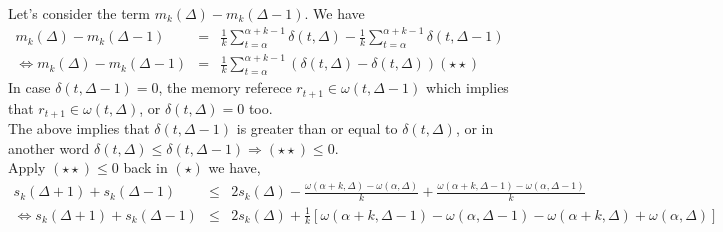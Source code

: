Let's consider the term $m_k(\Delta) - m_k(\Delta-1)$. We have
\begin{eqnarray*}
m_k(\Delta) - m_k(\Delta-1) &=& \frac{1}{k}\sum_{t=\alpha}^{\alpha+k-1}\delta(t,\Delta)
-\frac{1}{k}\sum_{t=\alpha}^{\alpha+k-1}\delta(t,\Delta-1) \\
\Leftrightarrow m_k(\Delta) - m_k(\Delta-1) &=& \frac{1}{k}\sum_{t=\alpha}^{\alpha+k-1}
(\delta(t,\Delta) - \delta(t,\Delta)) (\star \star)
\end{eqnarray*}
In case $\delta(t,\Delta-1) = 0$, the memory referece $r_{t+1} \in \omega(t,\Delta-1)$
which implies that $r_{t+1} \in \omega(t,\Delta)$, or $\delta(t,\Delta) = 0$ too.\\
The above implies that $\delta(t,\Delta-1)$ is greater than or equal to $\delta(t,\Delta)$,
or in another word $\delta(t,\Delta) \leq \delta(t,\Delta-1) \Rightarrow (\star \star) \leq 0$.\\
Apply $(\star \star) \leq 0$ back in $(\star)$ we have,\\
\begin{eqnarray*}
s_k(\Delta+1) + s_k(\Delta-1) &\leq& 2s_k(\Delta) - \frac{\omega(\alpha+k,\Delta)-\omega(\alpha,\Delta)}{k}
     + \frac{\omega(\alpha+k,\Delta -1)-\omega(\alpha,\Delta-1)}{k} \\
     \Leftrightarrow s_k(\Delta+1) + s_k(\Delta-1) &\leq& 2s_k(\Delta) +\frac{1}{k}[\omega(\alpha+k,\Delta-1)
     -\omega(\alpha, \Delta-1)-\omega(\alpha+k,\Delta)+\omega(\alpha,\Delta)]
\end{eqnarray*}

